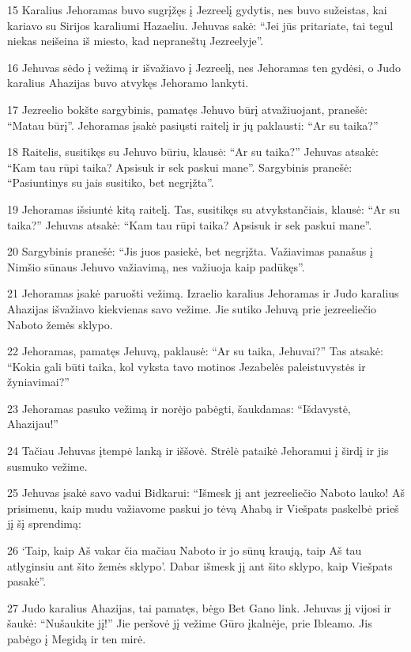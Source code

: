 \par 15 Karalius Jehoramas buvo sugrįžęs į Jezreelį gydytis, nes buvo sužeistas, kai kariavo su Sirijos karaliumi Hazaeliu. Jehuvas sakė: “Jei jūs pritariate, tai tegul niekas neišeina iš miesto, kad nepraneštų Jezreelyje”. 
\par 16 Jehuvas sėdo į vežimą ir išvažiavo į Jezreelį, nes Jehoramas ten gydėsi, o Judo karalius Ahazijas buvo atvykęs Jehoramo lankyti. 
\par 17 Jezreelio bokšte sargybinis, pamatęs Jehuvo būrį atvažiuojant, pranešė: “Matau būrį”. Jehoramas įsakė pasiųsti raitelį ir jų paklausti: “Ar su taika?” 
\par 18 Raitelis, susitikęs su Jehuvo būriu, klausė: “Ar su taika?” Jehuvas atsakė: “Kam tau rūpi taika? Apsisuk ir sek paskui mane”. Sargybinis pranešė: “Pasiuntinys su jais susitiko, bet negrįžta”. 
\par 19 Jehoramas išsiuntė kitą raitelį. Tas, susitikęs su atvykstančiais, klausė: “Ar su taika?” Jehuvas atsakė: “Kam tau rūpi taika? Apsisuk ir sek paskui mane”. 
\par 20 Sargybinis pranešė: “Jis juos pasiekė, bet negrįžta. Važiavimas panašus į Nimšio sūnaus Jehuvo važiavimą, nes važiuoja kaip padūkęs”. 
\par 21 Jehoramas įsakė paruošti vežimą. Izraelio karalius Jehoramas ir Judo karalius Ahazijas išvažiavo kiekvienas savo vežime. Jie sutiko Jehuvą prie jezreeliečio Naboto žemės sklypo. 
\par 22 Jehoramas, pamatęs Jehuvą, paklausė: “Ar su taika, Jehuvai?” Tas atsakė: “Kokia gali būti taika, kol vyksta tavo motinos Jezabelės paleistuvystės ir žyniavimai?” 
\par 23 Jehoramas pasuko vežimą ir norėjo pabėgti, šaukdamas: “Išdavystė, Ahazijau!” 
\par 24 Tačiau Jehuvas įtempė lanką ir iššovė. Strėlė pataikė Jehoramui į širdį ir jis susmuko vežime. 
\par 25 Jehuvas įsakė savo vadui Bidkarui: “Išmesk jį ant jezreeliečio Naboto lauko! Aš prisimenu, kaip mudu važiavome paskui jo tėvą Ahabą ir Viešpats paskelbė prieš jį šį sprendimą: 
\par 26 ‘Taip, kaip Aš vakar čia mačiau Naboto ir jo sūnų kraują, taip Aš tau atlyginsiu ant šito žemės sklypo’. Dabar išmesk jį ant šito sklypo, kaip Viešpats pasakė”. 
\par 27 Judo karalius Ahazijas, tai pamatęs, bėgo Bet Gano link. Jehuvas jį vijosi ir šaukė: “Nušaukite jį!” Jie peršovė jį vežime Gūro įkalnėje, prie Ibleamo. Jis pabėgo į Megidą ir ten mirė. 
